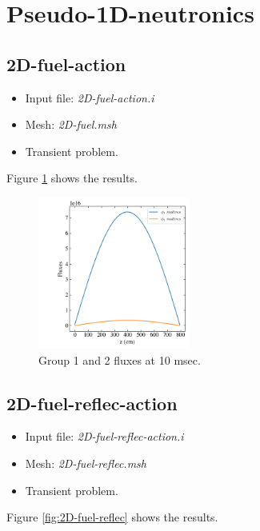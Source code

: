 \documentclass[11pt,letterpaper]{article}
\begin{document}
\section{Pseudo-1D-neutronics}

\subsection{2D-fuel-action}

	\begin{itemize}
		\item Input file: \textit{2D-fuel-action.i}
		\item Mesh: \textit{2D-fuel.msh}
		\item Transient problem.
	\end{itemize}

Figure \ref{fig:2D-fuel-action} shows the results.

	\begin{figure}[htbp!]
		\centering
		\includegraphics[height=5cm]{2D-fuel-action}
		\caption{Group 1 and 2 fluxes at 10 msec.}
		\label{fig:2D-fuel-action}
	\end{figure}

\subsection{2D-fuel-reflec-action}

	\begin{itemize}
		\item Input file: \textit{2D-fuel-reflec-action.i}
		\item Mesh: \textit{2D-fuel-reflec.msh}
		\item Transient problem.
	\end{itemize}

Figure \ref{fig:2D-fuel-reflec} shows the results.
\end{document}
